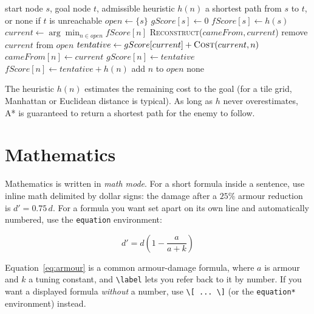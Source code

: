 \documentclass[a4paper,twoside,twocolumn]{IEEEtran}
\begin{document}
\begin{algorithm}[t]
\caption{A* Pathfinding over a Navigation Grid}\label{alg:astar}
\begin{algorithmic}[1]
\REQUIRE start node $s$, goal node $t$, admissible heuristic $h(n)$
\ENSURE a shortest path from $s$ to $t$, or none if $t$ is unreachable
\STATE $open \gets \{s\}$ 
\STATE $gScore[s] \gets 0$
\STATE $fScore[s] \gets h(s)$
    \STATE $current \gets \arg\min_{n \in open} fScore[n]$
        \RETURN \textsc{Reconstruct}($cameFrom, current$)
    \ENDIF
    \STATE remove $current$ from $open$
        \STATE $tentative \gets gScore[current] + \textsc{Cost}(current, n)$
            \STATE $cameFrom[n] \gets current$
            \STATE $gScore[n] \gets tentative$
            \STATE $fScore[n] \gets tentative + h(n)$
                \STATE add $n$ to $open$
            \ENDIF
        \ENDIF
    \ENDFOR
\ENDWHILE
\RETURN none
\end{algorithmic}
\end{algorithm}

The heuristic $h(n)$ estimates the remaining cost to the goal (for a tile grid,
Manhattan or Euclidean distance is typical). As long as $h$ never overestimates,
A* is guaranteed to return a shortest path for the enemy to follow.



\section{Mathematics}
\label{sec:math}

Mathematics is written in \emph{math mode}. For a short formula inside a
sentence, use inline math delimited by dollar signs: the damage after a
$25\%$ armour reduction is $d' = 0.75\,d$. For a formula you want set apart on
its own line and automatically numbered, use the \texttt{equation} environment:

\begin{equation}
d' = d \left(1 - \frac{a}{a + k}\right)
\label{eq:armour}
\end{equation}

Equation~\ref{eq:armour} is a common armour-damage formula, where $a$ is armour
and $k$ a tuning constant, and \verb|\label| lets you refer back to it by number.
If you want a displayed formula \emph{without} a number, use \verb|\[ ... \]| (or
the \texttt{equation*} environment) instead.
\end{document}
